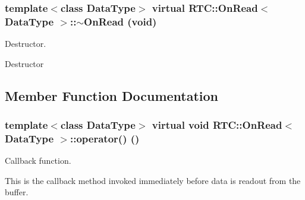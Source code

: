 \subsubsection[{$\sim$OnRead}]{\setlength{\rightskip}{0pt plus 5cm}template$<$class DataType$>$ virtual {\bf RTC::OnRead}$<$ DataType $>$::$\sim${\bf OnRead} (void)\hspace{0.3cm}{\ttfamily  [inline, virtual]}}\label{structRTC_1_1OnRead_a20a17e2f2e297cef090ae6694535aa4f}


Destructor. 

Destructor 

\subsection{Member Function Documentation}
\subsubsection[{operator()}]{\setlength{\rightskip}{0pt plus 5cm}template$<$class DataType$>$ virtual void {\bf RTC::OnRead}$<$ DataType $>$::operator() ()\hspace{0.3cm}{\ttfamily  [pure virtual]}}\label{structRTC_1_1OnRead_abf996b7db051b969ac4a02882f4e0962}


Callback function. 

This is the callback method invoked immediately before data is readout from the buffer. 